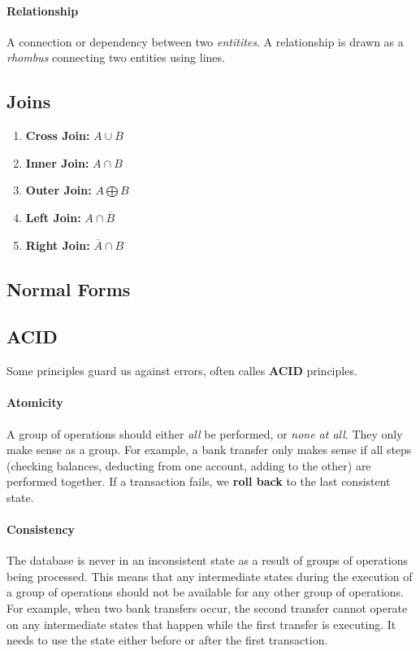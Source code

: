 \paragraph{Relationship} A connection or dependency between two \textit{entitites}. A relationship is drawn as a \textit{rhombus} connecting two entities using lines.

\subsection{Joins}

\begin{enumerate}
	\item \textbf{Cross Join:} \(A \cup B\)  
	\item \textbf{Inner Join:} \(A \cap B\)
	\item \textbf{Outer Join:} \(A \bigoplus B\)
	\item \textbf{Left Join:}  \(A \cap \overline{B}\)
	\item \textbf{Right Join:} \(\overline{A} \cap B\) 
\end{enumerate}

\subsection{Normal Forms}

\subsection{ACID}

Some principles guard us against errors, often calles \textbf{ACID} principles.

\paragraph{Atomicity} A group of operations should either \textit{all} be performed, or \textit{none at all}. They only make sense as a group. For example, a bank transfer only makes sense if all steps (checking balances, deducting from one account, adding to the other) are performed together. If a transaction fails, we \textbf{roll back} to the last consistent state.

\paragraph{Consistency} The database is never in an inconsistent state as a result of groups of operations being processed. This means that any intermediate states during the execution of a group of operations should not be available for any other group of operations. For example, when two bank transfers occur, the second transfer cannot operate on any intermediate states that happen while the first transfer is executing. It needs to use the state either before or after the first transaction.


